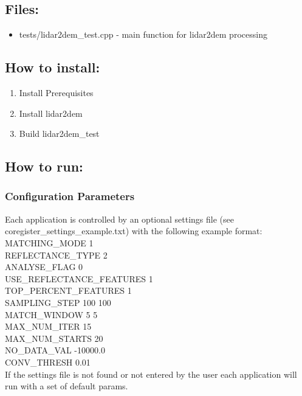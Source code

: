 \subsection{Files:}
\begin{itemize}
	\item{tests/lidar2dem\_test.cpp} - main function for lidar2dem processing

\end{itemize}


\subsection{How to install:}
\begin{enumerate}
	\item{Install Prerequisites}
	\item{Install lidar2dem} 
	\item{Build lidar2dem\_test}
\end{enumerate}

\subsection{How to run:}

\subsubsection{Configuration Parameters}
Each application is controlled by an optional settings file (see coregister\_settings\_example.txt) with the following example format:\\
MATCHING\_MODE 1\\
REFLECTANCE\_TYPE 2\\
ANALYSE\_FLAG 0\\
USE\_REFLECTANCE\_FEATURES 1\\
TOP\_PERCENT\_FEATURES 1\\
SAMPLING\_STEP 100 100\\
MATCH\_WINDOW 5 5\\
MAX\_NUM\_ITER 15\\
MAX\_NUM\_STARTS 20\\
NO\_DATA\_VAL -10000.0\\
CONV\_THRESH 0.01\\

If the settings file is not found or not entered by the user each application will run with a set of default params.


